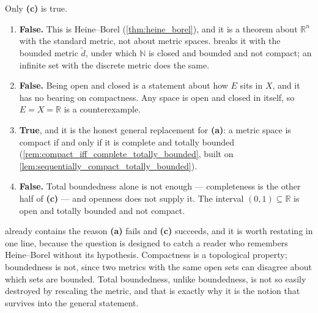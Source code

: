 \begin{exercisesolution}
\label{sol:kobel_compactness_characterisation}
Only \textbf{(c)} is true.
\begin{enumerate}[label=\textbf{(\alph*)}]
  \item \textbf{False.} This is Heine--Borel (\cref{thm:heine_borel}), and it is a theorem about
    $\mathbb{R}^n$ with the standard metric, not about metric spaces. 
    breaks it with the bounded metric $\tilde d$, under which $\mathbb{N}$ is closed and bounded
    and not compact; an infinite set with the discrete metric does the same.
  \item \textbf{False.} Being open and closed is a statement about how $E$ sits in $X$, and it has
    no bearing on compactness. Any space is open and closed in itself, so $E = X = \mathbb{R}$ is
    a counterexample.
  \item \textbf{True}, and it is the honest general replacement for \textbf{(a)}: a metric space is
    compact if and only if it is complete and totally bounded
    (\cref{rem:compact_iff_complete_totally_bounded}, built on
    \cref{lem:sequentially_compact_totally_bounded}).
  \item \textbf{False.} Total boundedness alone is not enough --- completeness is the other half of
    \textbf{(c)} --- and openness does not supply it. The interval $(0,1) \subseteq \mathbb{R}$ is
    open and totally bounded and not compact.
\end{enumerate}
\begin{remark}
 already contains the reason \textbf{(a)} fails and
\textbf{(c)} succeeds, and it is worth restating in one line, because the question is designed to
catch a reader who remembers Heine--Borel without its hypothesis. Compactness is a topological
property; boundedness is not, since two metrics with the same open sets can disagree about which
sets are bounded. Total boundedness, unlike boundedness, is not so easily destroyed by rescaling
the metric, and that is exactly why it is the notion that survives into the general statement.
\end{remark}
\end{exercisesolution}

